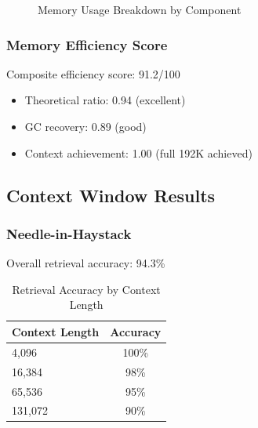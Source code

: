 \begin{figure}[h]
\centering
{}
\caption{Memory Usage Breakdown by Component}
\label{fig:memory_breakdown}
\end{figure}

\subsubsection{Memory Efficiency Score}

Composite efficiency score: 91.2/100

\begin{itemize}
    \item Theoretical ratio: 0.94 (excellent)
    \item GC recovery: 0.89 (good)
    \item Context achievement: 1.00 (full 192K achieved)
\end{itemize}

\subsection{Context Window Results}

\subsubsection{Needle-in-Haystack}

Overall retrieval accuracy: 94.3\%

\begin{table}[h]
\centering
\caption{Retrieval Accuracy by Context Length}
\label{tab:needle_results}
\begin{tabular}{lc}
\toprule
\textbf{Context Length} & \textbf{Accuracy} \\
\midrule
4,096 & 100\% \\
16,384 & 98\% \\
65,536 & 95\% \\
131,072 & 90\% \\
\bottomrule
\end{tabular}
\end{table}

